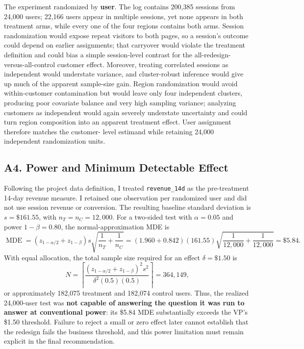 \documentclass[11pt]{article}
\begin{document}
The experiment randomized by \textbf{user}. The log contains 200,385 sessions
from 24,000 users; 22,166 users appear in multiple sessions, yet none appears
in both treatment arms, while every one of the four regions contains both
arms. Session randomization would expose repeat visitors to both pages, so a
session's outcome could depend on earlier assignments; that carryover would
violate the treatment definition and could bias a simple session-level
contrast for the all-redesign-versus-all-control customer effect. Moreover,
treating correlated sessions as independent would understate variance, and
cluster-robust inference would give up much of the apparent sample-size gain.
Region randomization would avoid within-customer contamination but would
leave only four independent clusters, producing poor covariate balance and
very high sampling variance; analyzing customers as independent would again
severely understate uncertainty and could turn region composition into an
apparent treatment effect. User assignment therefore matches the customer-
level estimand while retaining 24,000 independent randomization units.

\subsection*{A4. Power and Minimum Detectable Effect}

Following the project data definition, I treated \texttt{revenue\_14d} as the
pre-treatment 14-day revenue measure. I retained one observation per
randomized user and did not use session revenue or conversion. The resulting
baseline standard deviation is $s=\$161.55$, with
$n_T=n_C=12{,}000$. For a two-sided test with
$\alpha=0.05$ and power $1-\beta=0.80$, the normal-approximation MDE is
\[
\operatorname{MDE}
=(z_{1-\alpha/2}+z_{1-\beta})s
  \sqrt{\frac{1}{n_T}+\frac{1}{n_C}}
=(1.960+0.842)(161.55)\sqrt{\frac{1}{12{,}000}+\frac{1}{12{,}000}}
=\$5.84.
\]
With equal allocation, the total sample size required for an effect
$\delta=\$1.50$ is
\[
N
=\left\lceil
  \frac{(z_{1-\alpha/2}+z_{1-\beta})^2s^2}
       {\delta^2(0.5)(0.5)}
 \right\rceil
=364{,}149,
\]
or approximately 182,075 treatment and 182,074 control users. Thus, the
realized 24,000-user test was \textbf{not capable of answering the question it
was run to answer at conventional power}: its \$5.84 MDE substantially exceeds
the VP's \$1.50 threshold. Failure to reject a small or zero effect later
cannot establish that the redesign fails the business threshold, and this
power limitation must remain explicit in the final recommendation.
\end{document}
